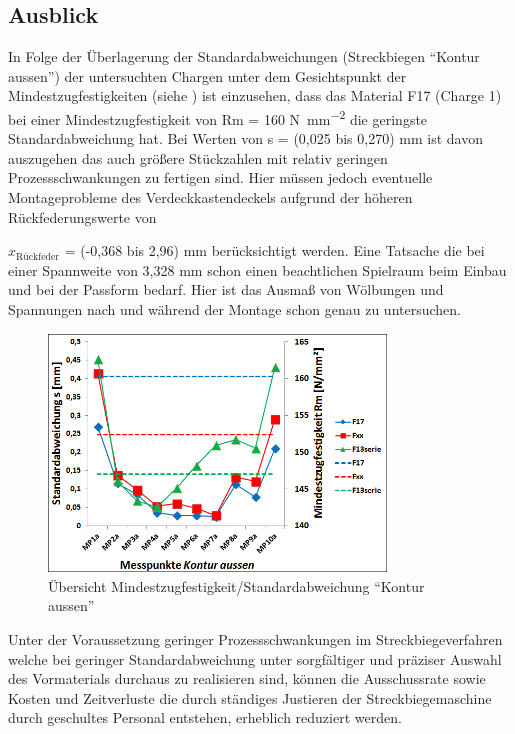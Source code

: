 \documentclass[12pt,a4paper,parskip]{scrartcl}
\begin{document}
\newpage

\subsection{Ausblick}
In Folge der Überlagerung der Standardabweichungen (Streckbiegen "`Kontur aussen"') der untersuchten Chargen unter dem Gesichtspunkt der Mindestzugfestigkeiten (siehe ) ist einzusehen, dass das Material F17 (Charge 1) bei einer Mindestzugfestigkeit von Rm = 160  \si{\newton\per\milli\meter\squared}  die geringste Standardabweichung hat. Bei Werten von s = (0,025  bis 0,270) \si{\milli\meter}  ist davon auszugehen das auch größere Stückzahlen mit relativ geringen Prozessschwankungen zu fertigen sind. Hier müssen jedoch eventuelle Montageprobleme des Verdeckkastendeckels aufgrund der höheren Rückfederungswerte von {$x_{\text{Rückfeder}}$ = (-0,368  bis 2,96) \si{\milli\meter} berücksichtigt werden. Eine Tatsache die bei einer Spannweite von 3,328 \si{\milli\meter} schon einen beachtlichen Spielraum beim Einbau und bei der Passform bedarf.  %
Hier ist das Ausmaß von Wölbungen und Spannungen nach und während der Montage schon genau zu untersuchen.

\begin{figure}[hbtp]
\centering
\includegraphics[width=0.8\textwidth]{standzugrel}
\caption{Übersicht Mindestzugfestigkeit/Standardabweichung "`Kontur aussen"'}
\label{fig:standzugrel}
\end{figure} 


Unter der Voraussetzung geringer Prozessschwankungen im Streckbiegeverfahren welche bei geringer Standardabweichung unter sorgfältiger und präziser Auswahl des Vormaterials durchaus zu realisieren sind, können die Ausschussrate sowie Kosten und Zeitverluste die durch ständiges Justieren der Streckbiegemaschine durch geschultes Personal entstehen, erheblich reduziert werden.

}
\end{document}
